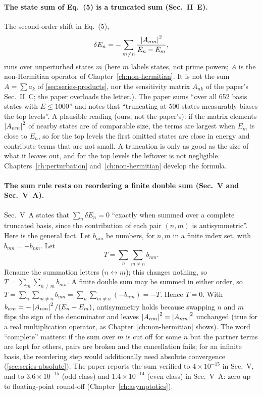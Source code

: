 \paragraph{The state sum of Eq.~(5) is a truncated sum (Sec.~II~E).} The second-order shift in Eq.~(5),
\[
\delta E_n=-\sum_{m\ne n}\frac{\left\lvert A_{nm}\right\rvert^2}{E_n-E_m},
\]
runs over unperturbed states $m$ (here $m$ labels states, not prime powers; $A$ is the non-Hermitian operator of Chapter~\ref{ch:non-hermitian}. It is not the sum $A=\sum a_k$ of \cref{sec:series-products}, nor the sensitivity matrix $A_{nk}$ of the paper's Sec.~II~C; the paper overloads the letter.). The paper sums ``over all 652 basis states with $E\le1000$'' and notes that ``truncating at 500 states measurably biases the top levels''. A plausible reading (ours, not the paper's): if the matrix elements $\left\lvert A_{nm}\right\rvert^2$ of nearby states are of comparable size, the terms are largest when $E_m$ is close to $E_n$, so for the top levels the first omitted states are close in energy and contribute terms that are not small. A truncation is only as good as the size of what it leaves out, and for the top levels the leftover is not negligible. Chapters~\ref{ch:perturbation} and~\ref{ch:non-hermitian} develop the formula.

\paragraph{The sum rule rests on reordering a finite double sum (Sec.~V and Sec.~V~A).} Sec.~V~A states that $\sum_n\delta E_n=0$ ``exactly when summed over a complete truncated basis, since the contribution of each pair $(n,m)$ is antisymmetric''. Here is the general fact. Let $b_{nm}$ be numbers, for $n,m$ in a finite index set, with $b_{mn}=-b_{nm}$. Let
\begin{equation}
T=\sum_n\sum_{m\ne n}b_{nm}.
\label{eq:series-pair}
\end{equation}
Rename the summation letters ($n\leftrightarrow m$); this changes nothing, so $T=\sum_m\sum_{n\ne m}b_{mn}$. A finite double sum may be summed in either order, so $T=\sum_n\sum_{m\ne n}b_{mn}=\sum_n\sum_{m\ne n}(-b_{nm})=-T$. Hence $T=0$. With $b_{nm}=-\left\lvert A_{nm}\right\rvert^2/(E_n-E_m)$, antisymmetry holds because swapping $n$ and $m$ flips the sign of the denominator and leaves $\left\lvert A_{nm}\right\rvert^2=\left\lvert A_{mn}\right\rvert^2$ unchanged (true for a real multiplication operator, as Chapter~\ref{ch:non-hermitian} shows). The word ``complete'' matters: if the sum over $m$ is cut off for some $n$ but the partner terms are kept for others, pairs are broken and the cancellation fails; for an infinite basis, the reordering step would additionally need absolute convergence (\cref{sec:series-absolute}). The paper reports the sum verified to $4\times10^{-15}$ in Sec.~V, and to $3.6\times10^{-15}$ (odd class) and $1.4\times10^{-14}$ (even class) in Sec.~V~A: zero up to floating-point round-off (Chapter~\ref{ch:asymptotics}).

